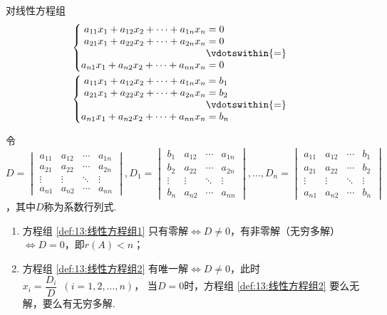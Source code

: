 \begin{theorem}  \label{thm:13:Cramer}
    对线性方程组
    \begin{gather}
        \label{def:13:线性方程组1}
        \begin{cases} \begin{aligned}
            a_{11}x_1+a_{12}x_2+\cdots+a_{1n}x_n &= 0 \\
            a_{21}x_1+a_{22}x_2+\cdots+a_{2n}x_n &= 0 \\
            &\vdotswithin{ = } \\
            a_{n1}x_1+a_{n2}x_2+\cdots+a_{nn}x_n &= 0
        \end{aligned} \end{cases}
        \\
        \label{def:13:线性方程组2}
        \begin{cases} \begin{aligned}
            a_{11}x_1+a_{12}x_2+\cdots+a_{1n}x_n &= b_1 \\
            a_{21}x_1+a_{22}x_2+\cdots+a_{2n}x_n &= b_2 \\
            &\vdotswithin{ = } \\
            a_{n1}x_1+a_{n2}x_2+\cdots+a_{nn}x_n &= b_n
        \end{aligned} \end{cases}
    \end{gather}

    令$D=\begin{vmatrix}
        a_{11} & a_{12} & \cdots & a_{1n} \\
        a_{21} & a_{22} & \cdots & a_{2n} \\
        \vdots & \vdots & \ddots & \vdots \\
        a_{n1} & a_{n2} & \cdots & a_{nn}
    \end{vmatrix},D_1=\begin{vmatrix}
        b_1 & a_{12} & \cdots & a_{1n} \\
        b_2 & a_{22} & \cdots & a_{2n} \\
        \vdots & \vdots & \ddots & \vdots \\
        b_n & a_{n2} & \cdots & a_{nn}
    \end{vmatrix},\ldots,D_n=\begin{vmatrix}
        a_{11} & a_{12} & \cdots & b_1 \\
        a_{21} & a_{22} & \cdots & b_2 \\
        \vdots & \vdots & \ddots & \vdots \\
        a_{n1} & a_{n2} & \cdots & b_n
    \end{vmatrix}$，其中$D$称为系数行列式.
    \begin{enumerate}
        \item 方程组 \ref{def:13:线性方程组1} 只有零解$\iff D \neq 0$，有非零解（无穷多解）$\iff D=0$，即$r(A)<n$；

        \item 方程组 \ref{def:13:线性方程组2} 有唯一解$\iff D \neq 0$，此时$x_i=\dfrac{D_i}{D}\enspace(i=1,2,\ldots,n)$，
        当$D=0$时，方程组 \ref{def:13:线性方程组2} 要么无解，要么有无穷多解.
    \end{enumerate}
\end{theorem}
